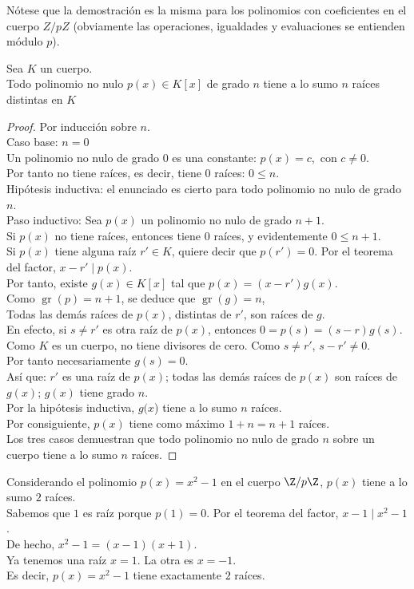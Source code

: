 Nótese que la demostración es la misma para los polinomios con coeficientes en el cuerpo $Z/pZ$ (obviamente las operaciones, igualdades y evaluaciones se entienden módulo $p$).

\begin{enunciado}\label{enun:numRaices}
Sea $K$ un cuerpo. \\
Todo polinomio no nulo $p(x)\in K[x]$ de grado $n$ tiene a lo sumo $n$ raíces distintas en $K$
\end{enunciado}

\begin{proof}
Por inducción sobre $n$. \\
Caso base: $n=0$ \\
Un polinomio no nulo de grado $0$ es una constante: $p(x)=c$,\, con $c\neq0$. \\
Por tanto no tiene raíces, es decir, tiene $0$ raíces: $0 \leq n$. \\
Hipótesis inductiva: el enunciado es cierto para todo polinomio no nulo de grado $n$. \\
Paso inductivo: Sea $p(x)$ un polinomio no nulo de grado $n+1$. \\
Si $p(x)$ no tiene raíces, entonces tiene $0$ raíces, y evidentemente $0\leq n+1$. \\
Si $p(x)$ tiene alguna raíz $r' \in K$, quiere decir que $p(r')=0$. Por el teorema del factor, $x-r' \mid p(x)$. \\
Por tanto, existe $g(x) \in K[x]$ tal que $p(x)=(x-r')g(x)$. \\
Como $\operatorname{gr}(p)=n+1$, se deduce que $\operatorname{gr}(g)=n$, \\
Todas las demás raíces de $p(x)$, distintas de $r'$, son raíces de $g$. \\
En efecto, si $s \neq r'$ es otra raíz de $p(x)$, entonces $0=p(s)=(s-r)g(s)$. \\
Como $K$ es un cuerpo, no tiene divisores de cero. Como $s \neq r'$, $s-r' \neq 0$. \\
Por tanto necesariamente $g(s)=0$. \\
Así que: $r'$ es una raíz de $p(x)$; todas las demás raíces de $p(x)$ son raíces de $g(x)$; $g(x)$ tiene grado $n$. \\
Por la hipótesis inductiva, $g(x$) tiene a lo sumo $n$ raíces. \\
Por consiguiente, $p(x)$ tiene como máximo $1+n=n+1$ raíces. \\
Los tres casos demuestran que todo polinomio no nulo de grado $n$ sobre un cuerpo tiene a lo sumo $n$ raíces.
\end{proof}

Considerando  el polinomio $p(x)=x^2-1$ en el cuerpo $\Z/p\Z$, $p(x)$ tiene a lo sumo $2$ raíces. \\
Sabemos que $1$ es raíz porque $p(1)=0$. Por el teorema del factor, $x-1 \mid x^2-1$. \\
De hecho, $x^2-1=(x-1)(x+1)$. \\
Ya tenemos una raíz $x=1$. La otra es $x=-1$. \\
Es decir, $p(x)=x^2-1$ tiene exactamente $2$ raíces.

